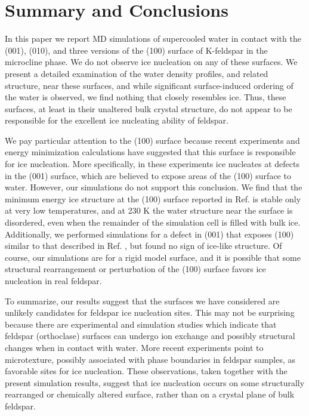 \documentclass[preprint,aps,prb,floatfix]{revtex4-1}
\begin{document}
\section{Summary and Conclusions}
\label{summary}

In this paper we report MD simulations of supercooled water in contact with the (001), (010), and three versions of the (100) surface of K-feldspar in the microcline phase. We do not observe ice nucleation on any of these surfaces. We  
present a detailed examination of the water density profiles, and related structure, near these surfaces, and while significant surface-induced ordering of the water is observed, we find nothing that closely resembles ice. Thus, these surfaces, at least in their unaltered bulk crystal structure, do not appear to be responsible for the excellent ice nucleating ability of feldspar. 

We pay particular attention to the (100) surface because recent experiments and energy minimization calculations have suggested that this surface is responsible for ice nucleation.\cite{KBPC17} More specifically, in these experiments ice nucleates at defects in the (001) surface, which are believed to expose areas of the (100) surface to water. 
However, our simulations do not support this conclusion. We find that the minimum energy ice structure at the (100) surface reported in Ref.  is stable only at very low temperatures, and at 230 K the water structure near the surface is disordered, even when the remainder of the simulation cell is filled with bulk ice. Additionally, we performed simulations for a defect in (001) that exposes (100) similar to that described in Ref. , but found no sign of ice-like structure. Of course, our simulations are for a rigid model surface, and it is possible that some structural rearrangement or perturbation of the (100) surface favors ice nucleation in real feldspar. 

To summarize, our results suggest that the surfaces we have considered are unlikely candidates for feldspar ice nucleation sites. This may not be surprising because there are experimental\cite{FTGH00,FCPZ03} and simulation\cite{KLI08} studies which indicate that feldspar (orthoclase) surfaces can undergo ion exchange and possibly structural changes when in contact with water. More recent experiments\cite{WHKK17,HWTO19} point to microtexture, possibly associated with phase boundaries in feldspar samples, as favorable sites for ice nucleation. These observations, taken together with the present simulation results, suggest that ice nucleation occurs on some structurally rearranged or chemically altered surface, rather than on a crystal plane of bulk feldspar.   
\end{document}
